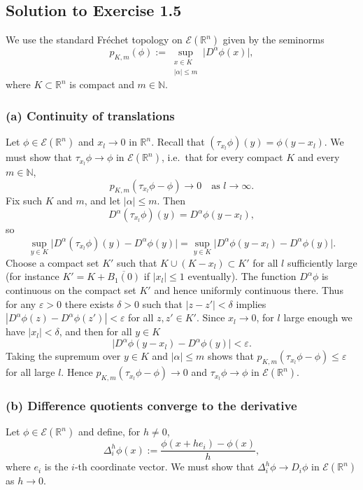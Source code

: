 \documentclass[12pt,a4paper]{article}
\theoremstyle{plain}
\theoremstyle{definition}
\theoremstyle{remark}
\theoremstyle{remark}
\begin{document}
\subsection*{Solution to Exercise 1.5}

We use the standard Fréchet topology on $\mathcal{E}(\mathbb{R}^n)$
given by the seminorms
\[
p_{K,m}(\phi)
:= \sup_{\substack{x\in K\\ |\alpha|\le m}}
\bigl|D^\alpha\phi(x)\bigr|,
\]
where $K\subset\mathbb{R}^n$ is compact and $m\in\mathbb{N}$.

\subsubsection*{(a) Continuity of translations}

Let $\phi\in\mathcal{E}(\mathbb{R}^n)$ and $x_l\to 0$ in $\mathbb{R}^n$.
Recall that $(\tau_{x_l}\phi)(y)=\phi(y-x_l)$.  We must show that
$\tau_{x_l}\phi\to\phi$ in $\mathcal{E}(\mathbb{R}^n)$, i.e.\ that for
every compact $K$ and every $m\in\mathbb{N}$,
\[
p_{K,m}(\tau_{x_l}\phi - \phi) \to 0 \quad\text{as }l\to\infty.
\]
Fix such $K$ and $m$, and let $|\alpha|\le m$.  Then
\[
D^\alpha(\tau_{x_l}\phi)(y) = D^\alpha\phi(y-x_l),
\]
so
\[
\sup_{y\in K} \bigl|D^\alpha(\tau_{x_l}\phi)(y) - D^\alpha\phi(y)\bigr|
= \sup_{y\in K} \bigl|D^\alpha\phi(y-x_l) - D^\alpha\phi(y)\bigr|.
\]
Choose a compact set $K'$ such that $K\cup(K-x_l)\subset K'$ for all $l$
sufficiently large (for instance $K' = K + \overline{B_1(0)}$ if
$|x_l|\le 1$ eventually).  The function $D^\alpha\phi$ is continuous on
the compact set $K'$ and hence uniformly continuous there.  Thus for any
$\varepsilon>0$ there exists $\delta>0$ such that
$|z-z'|<\delta$ implies
$|D^\alpha\phi(z)-D^\alpha\phi(z')|<\varepsilon$ for all $z,z'\in K'$.
Since $x_l\to 0$, for $l$ large enough we have $|x_l|<\delta$, and then
for all $y\in K$
\[
\bigl|D^\alpha\phi(y-x_l) - D^\alpha\phi(y)\bigr| < \varepsilon.
\]
Taking the supremum over $y\in K$ and $|\alpha|\le m$ shows that
$p_{K,m}(\tau_{x_l}\phi - \phi) \le \varepsilon$ for all large $l$.
Hence $p_{K,m}(\tau_{x_l}\phi - \phi)\to 0$ and $\tau_{x_l}\phi\to\phi$
in $\mathcal{E}(\mathbb{R}^n)$.

\subsubsection*{(b) Difference quotients converge to the derivative}

Let $\phi\in\mathcal{E}(\mathbb{R}^n)$ and define, for $h\neq 0$,
\[
\Delta_i^h\phi(x) := \frac{\phi(x+he_i)-\phi(x)}{h},
\]
where $e_i$ is the $i$-th coordinate vector.  We must show that
$\Delta_i^h\phi\to D_i\phi$ in $\mathcal{E}(\mathbb{R}^n)$ as $h\to 0$.
\end{document}
